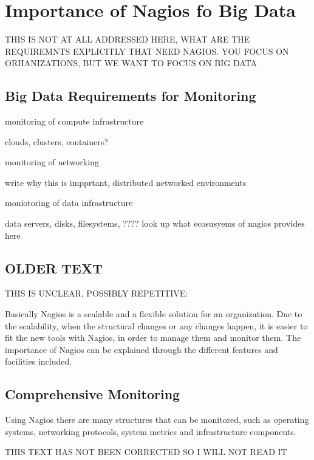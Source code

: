 \documentclass[9pt,twocolumn,twoside]{styles/osajnl}
\begin{document}
\section{Importance of Nagios fo Big Data}

THIS IS NOT AT ALL ADDRESSED HERE, WHAT ARE THE REQUIREMNTS EXPLICITLY
THAT NEED NAGIOS. YOU FOCUS ON ORHANIZATIONS, BUT WE WANT TO FOCUS ON
BIG DATA

\subsection{Big Data Requirements for Monitoring}

monitoring of compute infrastructure

   clouds, clusters, containers?

monitoring of networking 

    write why this is impprtant, distributed networked environments

moniotoring of data infrastructure

   data servers, disks, filesystems, ???? look up what ecosusyems of
   nagios provides here




\subsection{OLDER TEXT}

THIS IS UNCLEAR, POSSIBLY REPETITIVE:

Basically Nagios is a scalable and
a flexible solution for an organization. Due to the scalability, when
the structural changes or any changes happen, it is easier to fit the
new tools with Nagios, in order to manage them and monitor them. The
importance of Nagios can be explained through the different features
and facilities included.

\subsection{Comprehensive Monitoring}



Using Nagios there are many structures that can be monitored, such as
operating systems, networking protocols, system metrics and
infrastructure components. 

THIS TEXT HAS NOT BEEN CORRECTED SO I WILL NOT READ IT
\end{document}
